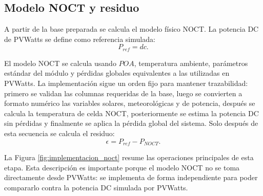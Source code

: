\documentclass[12pt, letterpaper]{article}
\begin{document}
\subsection{Modelo NOCT y residuo}

A partir de la base preparada se calcula el modelo f\'isico NOCT. La potencia DC de PVWatts se define como referencia simulada:
\[
    P_{ref} = dc.
\]

El modelo NOCT se calcula usando \(POA\), temperatura ambiente, par\'ametros est\'andar del m\'odulo y p\'erdidas globales equivalentes a las utilizadas en PVWatts. La implementaci\'on sigue un orden fijo para mantener trazabilidad: primero se validan las columnas requeridas de la base, luego se convierten a formato num\'erico las variables solares, meteorol\'ogicas y de potencia, despu\'es se calcula la temperatura de celda NOCT, posteriormente se estima la potencia DC sin p\'erdidas y finalmente se aplica la p\'erdida global del sistema. Solo despu\'es de esta secuencia se calcula el residuo:
\[
    \epsilon = P_{ref} - P_{NOCT}.
\]

La Figura \ref{fig:implementacion_noct} resume las operaciones principales de esta etapa. Esta descripci\'on es importante porque el modelo NOCT no se toma directamente desde PVWatts: se implementa de forma independiente para poder compararlo contra la potencia DC simulada por PVWatts.
\end{document}
